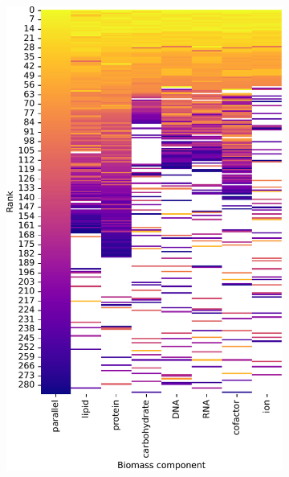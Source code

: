 \begin{figure}
  \centering
  \begin{subfigure}[t]{0.45\textwidth}
  \centering
    \includegraphics[width=\linewidth]{CompareEnzUse_glc00p00_pyr08p89_ammUnres_1.pdf}
    \caption{
    }
    \label{fig:model-rank-pyr-lowratio-rank}
  \end{subfigure}%
  \begin{subfigure}[t]{0.45\textwidth}
  \centering

\end{subfigure}
\end{figure}
